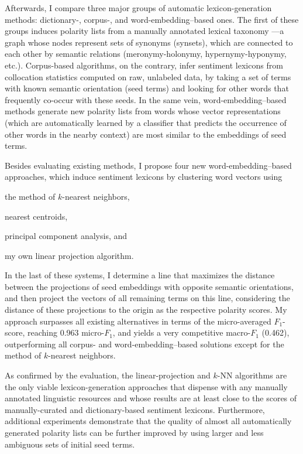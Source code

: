 \documentclass[11pt]{article}
\newcommand{\F}[0]{$F_1$}
\renewcommand{\cite}{\citep}
\begin{document}
Afterwards, I compare three major groups of automatic
lexicon-generation methods: dictionary-, corpus-, and
word-embedding--based ones.  The first of these groups induces
polarity lists from a manually annotated lexical taxonomy
\cite[\textsc{GermaNet}; ][]{Hamp:97}---a graph whose nodes represent
sets of synonyms (synsets), which are connected to each other by
semantic relations (meronymy-holonymy, hypernymy-hyponymy, etc.).
Corpus-based algorithms, on the contrary, infer sentiment lexicons
from collocation statistics computed on raw, unlabeled data, by taking
a set of terms with known semantic orientation (seed terms) and
looking for other words that frequently co-occur with these seeds.  In
the same vein, word-embedding--based methods generate new polarity
lists from words whose vector representations (which are automatically
learned by a classifier that predicts the occurrence of other words in
the nearby context) are most similar to the embeddings of seed terms.

Besides evaluating existing methods, I propose four new
word-embedding--based approaches, which induce sentiment lexicons by
clustering word vectors using
\begin{inparaenum}[(i)]
\item the method of $k$-nearest neighbors,
\item nearest centroids,
\item principal component analysis, and
\item my own linear projection algorithm.
\end{inparaenum}
In the last of these systems, I determine a line that maximizes the
distance between the projections of seed embeddings with opposite
semantic orientations, and then project the vectors of all remaining
terms on this line, considering the distance of these projections to
the origin as the respective polarity scores.  My approach surpasses
all existing alternatives in terms of the micro-averaged \F{}-score,
reaching 0.963 micro-\F{}, and yields a very competitive macro-\F{}
(0.462), outperforming all corpus- and word-embedding--based solutions
except for the method of $k$-nearest neighbors.

As confirmed by the evaluation, the linear-projection and $k$-NN
algorithms are the only viable lexicon-generation approaches that
dispense with any manually annotated linguistic resources and whose
results are at least close to the scores of manually-curated and
dictionary-based sentiment lexicons.  Furthermore, additional
experiments demonstrate that the quality of almost all automatically
generated polarity lists can be further improved by using larger and
less ambiguous sets of initial seed terms.
\end{document}
